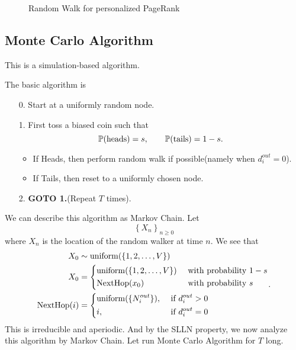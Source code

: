 \begin{figure}[H]
	\centering
	\caption{Random Walk for personalized PageRank}
	\label{fig:personalized-pagerank}
\end{figure}

\subsection{Monte Carlo Algorithm}
\begin{note}
	This is a simulation-based algorithm.
\end{note}

The basic algorithm is
\begin{enumerate}
	\item[0.] Start at a uniformly random node.
	\item[1.] First toss a biased coin such that
		\[
			\mathbb{\MakeUppercase{P}}(\text{heads}) = s,\qquad \mathbb{\MakeUppercase{P}}(\text{tails}) = 1 - s.
		\]
		\begin{itemize}
			\item If Heads, then perform random walk if possible(namely when \(d_i^{out}=0\)).
			\item If Tails, then reset to a uniformly chosen node.
		\end{itemize}
	\item[2.] \textbf{GOTO 1.}(Repeat \(T\) times).
\end{enumerate}

We can describe this algorithm as Markov Chain. Let
\[
	\left\{ X_n \right\}_{n\geq 0}
\]
where \(X_n\) is the location of the random walker at time \(n\). We see that
\[
	\begin{split}
		X_0 &\sim \mathrm{uniform}(\{1, 2, \ldots , V\})\\
		X_0 &=\begin{dcases}
			\mathrm{uniform}(\{1, 2, \ldots , V\}) & \text{ with probability }1 - s \\
			\mathrm{NextHop}(x_0)                  & \text{ with probability }s     \\
		\end{dcases}\\
		\mathrm{NextHop}(i)&=\begin{dcases}
			\mathrm{uniform}(\{N^{out}_i\}), & \text{ if }d^{out}_i>0   \\
			i,                               & \text{ if }d^{out}_i = 0
		\end{dcases}
	\end{split}.
\]
This is irreducible and aperiodic. And by the SLLN property, we now analyze this algorithm by Markov Chain. Let run Monte Carlo Algorithm
for \(T\) long.


